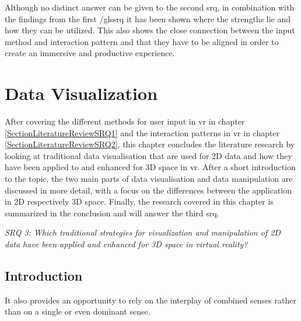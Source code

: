 Although no distinct answer can be given to the second \gls{srq}, in combination with the findings from the first /gls{srq} it has been shown where the strengths lie and how they can be utilized. This also shows the close connection between the input method and interaction pattern and that they have to be aligned in order to create an immersive and productive experience.



\section{Data Visualization}

\label{SectionLiteratureReviewSRQ3}

After covering the different methods for user input in \gls{vr} in chapter \ref{SectionLiteratureReviewSRQ1} and the interaction patterns in \gls{vr} in chapter \ref{SectionLiteratureReviewSRQ2}, this chapter concludes the literature research by looking at traditional data visualisation that are used for 2D data and how they have been applied to and enhanced for 3D space in \gls{vr}. After a short introduction to the topic, the two main parts of data visualisation and data manipulation are discussed in more detail, with a focus on the differences between the application in 2D respectively 3D space. Finally, the research covered in this chapter is summarized in the conclusion and will answer the third \gls{srq}.
\begin{framed}
	\textit{SRQ 3: Which traditional strategies for visualization and manipulation of 2D data have been applied and enhanced for 3D space in virtual reality?}
\end{framed}




\subsection{Introduction}



It also provides an opportunity to rely on the interplay of combined senses rather than on a single or even dominant sense.
\cite{Ribarsky1994}

